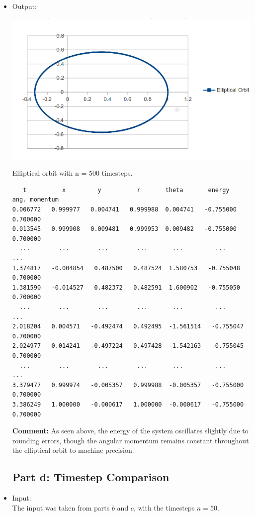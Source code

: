 \documentclass[10pt]{article}
\begin{document}
\begin{itemize}
\item Output:
\begin{center}
\includegraphics[scale=.5]{EllipticalOrbit}

\footnotesize Elliptical orbit with n = 500 timesteps.
\end{center}
\begin{verbatim}
   t          x         y          r       theta       energy   ang. momentum 
0.006772   0.999977   0.004741   0.999988  0.004741   -0.755000    0.700000
0.013545   0.999908   0.009481   0.999953  0.009482   -0.755000    0.700000
  ...        ...        ...        ...       ...         ...        ...
1.374817   -0.004854   0.487500   0.487524  1.580753   -0.755048    0.700000
1.381590   -0.014527   0.482372   0.482591  1.600902   -0.755050    0.700000
  ...        ...        ...        ...       ...         ...        ...
2.018204   0.004571   -0.492474   0.492495  -1.561514   -0.755047    0.700000
2.024977   0.014241   -0.497224   0.497428  -1.542163   -0.755045    0.700000
  ...        ...        ...        ...       ...         ...        ...
3.379477   0.999974   -0.005357   0.999988  -0.005357   -0.755000    0.700000
3.386249   1.000000   -0.000617   1.000000  -0.000617   -0.755000    0.700000
\end{verbatim}
\textbf{Comment:} As seen above, the energy of the system oscillates slightly due to rounding errors, though the angular momentum remains constant throughout the elliptical orbit to machine precision.

\subsection*{Part d: Timestep Comparison}
\item Input:\\
The input was taken from parts $b$ and $c$, with the timesteps $n=50$. 


\end{itemize}
\end{document}
